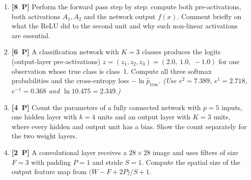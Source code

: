 \documentclass[11pt,a4paper]{article}
\newcommand{\pp}[1]{\textbf{[#1~P]}\enspace}
\begin{document}
\begin{enumerate}[label=(\alph*),leftmargin=7mm,itemsep=2.5mm]
  \item \pp{8} Perform the forward pass step by step: compute both pre-activations, both
    activations $A_1,A_2$ and the network output $f(x)$. Comment briefly on what the ReLU did
    to the second unit and why such non-linear activations are essential.
  \item \pp{6} A classification network with $K=3$ classes produces the logits (output-layer
    pre-activations) $z=(z_1,z_2,z_3)=(2.0,\ 1.0,\ -1.0)$ for one observation whose true class
    is class~1. Compute all three softmax probabilities and the cross-entropy loss
    $-\ln \hat{p}_{\text{true}}$.
    \emph{(Use $e^{2}=7.389$, $e^{1}=2.718$, $e^{-1}=0.368$ and $\ln 10.475=2.349$.)}
  \item \pp{4} Count the parameters of a fully connected network with $p=5$ inputs, one hidden
    layer with $k=4$ units and an output layer with $K=3$ units, where every hidden and output
    unit has a bias. Show the count separately for the two weight layers.
  \item \pp{2} A convolutional layer receives a $28\times 28$ image and uses filters of size
    $F=3$ with padding $P=1$ and stride $S=1$. Compute the spatial size of the output feature
    map from $\bigl(W-F+2P\bigr)/S+1$.
\end{enumerate}
\end{document}
